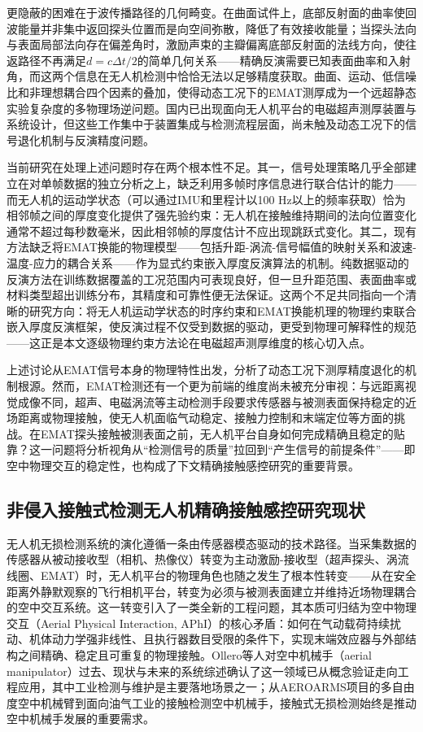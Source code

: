 更隐蔽的困难在于波传播路径的几何畸变。在曲面试件上，底部反射面的曲率使回波能量并非集中返回探头位置而是向空间弥散，降低了有效接收能量；当探头法向与表面局部法向存在偏差角时，激励声束的主瓣偏离底部反射面的法线方向，使往返路径不再满足$d = c\Delta t / 2$的简单几何关系——精确反演需要已知表面曲率和入射角，而这两个信息在无人机检测中恰恰无法以足够精度获取。曲面、运动、低信噪比和非理想耦合四个因素的叠加，使得动态工况下的EMAT测厚成为一个远超静态实验复杂度的多物理场逆问题。国内已出现面向无人机平台的电磁超声测厚装置与系统设计，但这些工作集中于装置集成与检测流程层面，尚未触及动态工况下的信号退化机制与反演精度问题。

当前研究在处理上述问题时存在两个根本性不足。其一，信号处理策略几乎全部建立在对单帧数据的独立分析之上，缺乏利用多帧时序信息进行联合估计的能力——而无人机的运动学状态（可以通过IMU和里程计以100 Hz以上的频率获取）恰为相邻帧之间的厚度变化提供了强先验约束：无人机在接触维持期间的法向位置变化通常不超过每秒数毫米，因此相邻帧的厚度估计不应出现跳跃式变化。其二，现有方法缺乏将EMAT换能的物理模型——包括升距-涡流-信号幅值的映射关系和波速-温度-应力的耦合关系——作为显式约束嵌入厚度反演算法的机制。纯数据驱动的反演方法在训练数据覆盖的工况范围内可表现良好，但一旦升距范围、表面曲率或材料类型超出训练分布，其精度和可靠性便无法保证。这两个不足共同指向一个清晰的研究方向：将无人机运动学状态的时序约束和EMAT换能机理的物理约束联合嵌入厚度反演框架，使反演过程不仅受到数据的驱动，更受到物理可解释性的规范——这正是本文逐级物理约束方法论在电磁超声测厚维度的核心切入点。

上述讨论从EMAT信号本身的物理特性出发，分析了动态工况下测厚精度退化的机制根源。然而，EMAT检测还有一个更为前端的维度尚未被充分审视：与远距离视觉成像不同，超声、电磁涡流等主动检测手段要求传感器与被测表面保持稳定的近场距离或物理接触，使无人机面临气动稳定、接触力控制和末端定位等方面的挑战。在EMAT探头接触被测表面之前，无人机平台自身如何完成精确且稳定的贴靠？这一问题将分析视角从“检测信号的质量”拉回到“产生信号的前提条件”——即空中物理交互的稳定性，也构成了下文精确接触感控研究的重要背景。

\subsection{非侵入接触式检测无人机精确接触感控研究现状}

无人机无损检测系统的演化遵循一条由传感器模态驱动的技术路径。当采集数据的传感器从被动接收型（相机、热像仪）转变为主动激励-接收型（超声探头、涡流线圈、EMAT）时，无人机平台的物理角色也随之发生了根本性转变——从在安全距离外静默观察的飞行相机平台，转变为必须与被测表面建立并维持近场物理耦合的空中交互系统。这一转变引入了一类全新的工程问题，其本质可归结为空中物理交互（Aerial Physical Interaction, APhI）的核心矛盾：如何在气动载荷持续扰动、机体动力学强非线性、且执行器数目受限的条件下，实现末端效应器与外部结构之间精确、稳定且可重复的物理接触。Ollero等人对空中机械手（aerial manipulator）过去、现状与未来的系统综述确认了这一领域已从概念验证走向工程应用，其中工业检测与维护是主要落地场景之一；从AEROARMS项目的多自由度空中机械臂到面向油气工业的接触检测空中机械手，接触式无损检测始终是推动空中机械手发展的重要需求。

